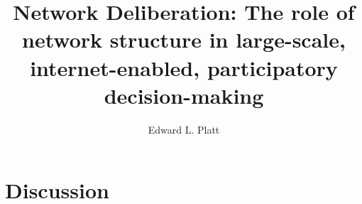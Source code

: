 \documentclass[thesis]{thesis-umich}
\title{Network Deliberation: The role of network structure in large-scale, internet-enabled, participatory decision-making}
\author{Edward L. Platt}
\begin{document}
\chapter{Discussion}
\label{chap:discussion}

%



\end{document}
